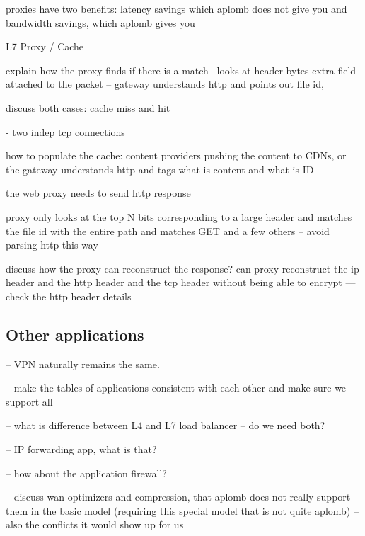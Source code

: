 proxies have two benefits: latency savings which aplomb does not give you 
and bandwidth savings, which aplomb gives you
 
L7 Proxy / Cache

explain how the proxy finds if there is  a match --looks at header bytes
extra field attached to the packet -- gateway understands http and points out file id, 

discuss both cases: cache miss and hit

- two indep tcp connections 

how to populate the cache: content providers pushing the content to CDNs, or the gateway understands
http and tags what is content and what is ID

the web proxy needs to send http response 

proxy only looks at the top N bits corresponding to a large header and matches the file id with the entire path
and matches GET and a few others -- avoid parsing http this way


discuss how the proxy can reconstruct the response?
can proxy reconstruct the ip header and the http header  and the tcp header without being able to encrypt
--- check the http header details


\subsection{Other applications}\label{sec:vpn} \label{sec:other} \label{sec:not_supp}

-- VPN naturally remains the same. 

-- make the tables of applications consistent with each other and make sure we support all 

-- what is difference between L4 and L7 load balancer -- do we need both?

-- IP forwarding app, what is that?

-- how about the application firewall?

-- discuss wan optimizers and compression, that aplomb does not really support them in the basic model (requiring this special model that is not quite aplomb) -- also the conflicts it would show up for us